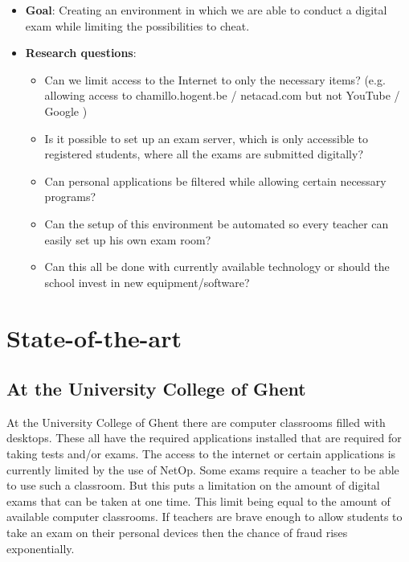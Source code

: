 \begin{itemize}
  \item \textbf{Goal}: Creating an environment in which we are able to conduct a digital exam while limiting the possibilities to cheat.
  \item \textbf{Research questions}:
\begin{itemize}
   \item Can we limit access to the Internet to only the necessary items? (e.g. allowing access to chamillo.hogent.be / netacad.com but not YouTube / Google )
   \item Is it possible to set up an exam server, which is only accessible to registered students, where all the exams are submitted digitally?
   \item Can personal applications be filtered while allowing certain necessary programs?
   \item Can the setup of this environment be automated so every teacher can easily set up his own exam room?
   \item Can this all be done with currently available technology or should the school invest in new equipment/software?
  \end{itemize}
\end{itemize}


\section{State-of-the-art}
\label{sec:state-of-the-art}

\subsection{At the University College of Ghent}
At the University College of Ghent there are computer classrooms filled with desktops. These all have the required applications installed that are required for taking tests and/or exams. The access to the internet or certain applications is currently limited by the use of NetOp. Some exams require a teacher to be able to use such a classroom. But this puts a limitation on the amount of digital exams that can be taken at one time. This limit being equal to the amount of available computer classrooms. If teachers are brave enough to allow students to take an exam on their personal devices then the chance of fraud rises exponentially. 
\\

